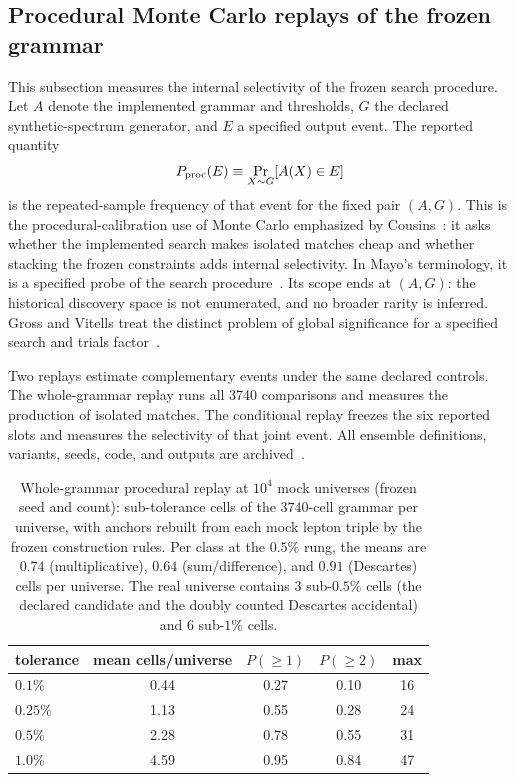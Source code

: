 \documentclass[aps,twocolumn,superscriptaddress,nofootinbib,floatfix]{revtex4-2}
\begin{document}
\subsection{Procedural Monte Carlo replays of the frozen grammar}
\label{sec:mcnull}

This subsection measures the internal selectivity of the frozen search procedure. Let $A$ denote the implemented grammar and thresholds, $G$ the declared synthetic-spectrum generator, and $E$ a specified output event. The reported quantity
\begin{equation}
P_{\rm proc}(E)\equiv\Pr_{X\sim G}[A(X)\in E]
\label{eq:pproc}
\end{equation}
is the repeated-sample frequency of that event for the fixed pair $(A,G)$. This is the procedural-calibration use of Monte Carlo emphasized by Cousins~\cite{Cousins2018}: it asks whether the implemented search makes isolated matches cheap and whether stacking the frozen constraints adds internal selectivity. In Mayo's terminology, it is a specified probe of the search procedure~\cite{Mayo2018}. Its scope ends at $(A,G)$: the historical discovery space is not enumerated, and no broader rarity is inferred. Gross and Vitells treat the distinct problem of global significance for a specified search and trials factor~\cite{GrossVitells}.

Two replays estimate complementary events under the same declared controls. The whole-grammar replay runs all 3740 comparisons and measures the production of isolated matches. The conditional replay freezes the six reported slots and measures the selectivity of that joint event. All ensemble definitions, variants, seeds, code, and outputs are archived~\cite{BrilliantGitHubEnum,BrilliantZenodoSupp}.

\begin{table}[t]
\caption{Whole-grammar procedural replay at $10^4$ mock universes (frozen seed and count): sub-tolerance cells of the $3740$-cell grammar per universe, with anchors
rebuilt from each mock lepton triple by the frozen construction rules. Per
class at the $0.5\%$ rung, the means are $0.74$ (multiplicative), $0.64$
(sum/difference), and $0.91$ (Descartes) cells per universe. The real
universe contains $3$ sub-$0.5\%$ cells (the declared candidate and the
doubly counted Descartes accidental) and $6$ sub-$1\%$ cells.}
\label{tab:mcnulla}
\begin{ruledtabular}
\begin{tabular}{lcccc}
tolerance & mean cells/universe & $P(\ge1)$ & $P(\ge2)$ & max \\
\hline
$0.1\%$ & 0.44 & 0.27 & 0.10 & 16 \\
$0.25\%$ & 1.13 & 0.55 & 0.28 & 24 \\
$0.5\%$ & 2.28 & 0.78 & 0.55 & 31 \\
$1.0\%$ & 4.59 & 0.95 & 0.84 & 47 \\
\end{tabular}
\end{ruledtabular}
\end{table}
\end{document}
